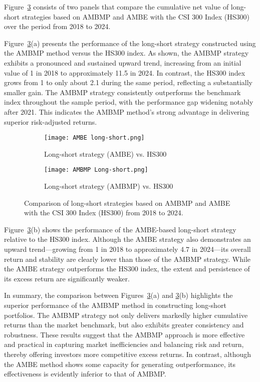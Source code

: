 \documentclass[preprint,12pt,authoryear]{elsarticle}
\begin{document}
Figure~\ref{fig:strategy_vs_index} consists of two panels that compare the cumulative net value of long-short strategies based on AMBMP and AMBE with the CSI 300 Index (HS300) over the period from 2018 to 2024.

Figure~\ref{fig:strategy_vs_index}(a) presents the performance of the long-short strategy constructed using the AMBMP method versus the HS300 index. As shown, the AMBMP strategy exhibits a pronounced and sustained upward trend, increasing from an initial value of 1 in 2018 to approximately 11.5 in 2024. In contrast, the HS300 index grows from 1 to only about 2.1 during the same period, reflecting a substantially smaller gain. The AMBMP strategy consistently outperforms the benchmark index throughout the sample period, with the performance gap widening notably after 2021. This indicates the AMBMP method’s strong advantage in delivering superior risk-adjusted returns.
\begin{figure}[!htbp]
  \centering
  \begin{subfigure}[b]{0.49\linewidth}
    \centering
    \texttt{[image: AMBE long-short.png]}
    \caption{Long-short strategy (AMBE) vs. HS300}
    \label{fig:strategy_vs_index_b}
  \end{subfigure}
  \hfill
  \begin{subfigure}[b]{0.49\linewidth}
    \centering
    \texttt{[image: AMBMP Long-short.png]}
    \caption{Long-short strategy (AMBMP) vs. HS300}
    \label{fig:strategy_vs_index_a}
  \end{subfigure}
  \caption{Comparison of long-short strategies based on AMBMP and AMBE with the CSI 300 Index (HS300) from 2018 to 2024.}
  \label{fig:strategy_vs_index}
\end{figure}


Figure~\ref{fig:strategy_vs_index}(b) shows the performance of the AMBE-based long-short strategy relative to the HS300 index. Although the AMBE strategy also demonstrates an upward trend—growing from 1 in 2018 to approximately 4.7 in 2024—its overall return and stability are clearly lower than those of the AMBMP strategy. While the AMBE strategy outperforms the HS300 index, the extent and persistence of its excess return are significantly weaker.

In summary, the comparison between Figures~\ref{fig:strategy_vs_index}(a) and \ref{fig:strategy_vs_index}(b) highlights the superior performance of the AMBMP method in constructing long-short portfolios. The AMBMP strategy not only delivers markedly higher cumulative returns than the market benchmark, but also exhibits greater consistency and robustness. These results suggest that the AMBMP approach is more effective and practical in capturing market inefficiencies and balancing risk and return, thereby offering investors more competitive excess returns. In contrast, although the AMBE method shows some capacity for generating outperformance, its effectiveness is evidently inferior to that of AMBMP.
\end{document}
